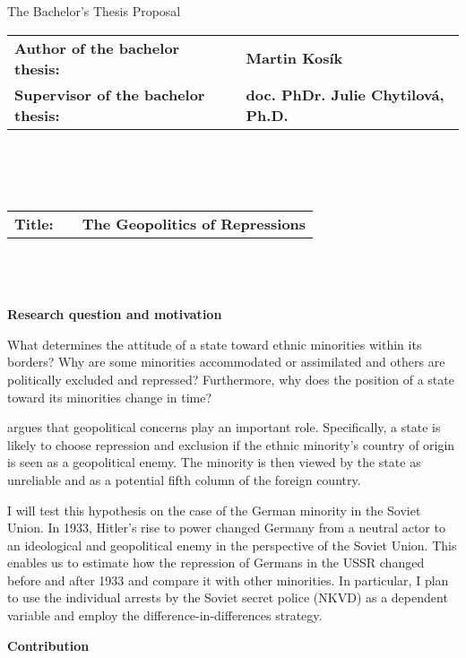 \pagestyle{empty}
\begin{center}
\LARGE{The Bachelor’s Thesis Proposal}
\end{center}
\vspace{5mm}
\begin{tabular}{lcl}
\large{\bf Author of the bachelor thesis:} & & \large{\bf Martin Kosík}\\
\large{\bf Supervisor of the bachelor thesis:} & & \large{\bf doc. PhDr. Julie Chytilová, Ph.D.}
\end{tabular}
\\
\\
\\
\begin{tabular}{lcl}
\large{\bf Title:} & & \large{\bf The Geopolitics of Repressions}
\end{tabular}\\
\\
\\
\large{\bf Research question and motivation}

\noindent
What determines the attitude of a state toward ethnic minorities within its borders? Why are some minorities accommodated or assimilated and others are politically excluded and repressed? Furthermore, why does the position of a state toward its minorities change in time? 

\citet{mylonas_politics_2013} argues that geopolitical concerns play an important role. Specifically, a state is likely to choose repression and exclusion if the ethnic minority's country of origin is seen as a geopolitical enemy. The minority is then viewed by the state as unreliable and as a potential fifth column of the foreign country. 

I will test this hypothesis on the case of the German minority in the Soviet Union. In 1933, Hitler’s rise to power changed Germany from a neutral actor to an ideological and geopolitical enemy in the perspective of the Soviet Union. This enables us to estimate how the repression of Germans in the USSR changed before and after 1933 and compare it with other minorities. In particular, I plan to use the individual arrests by the Soviet secret police (NKVD) as a dependent variable and employ the difference-in-differences strategy. 

\noindent  \large{\bf Contribution}

